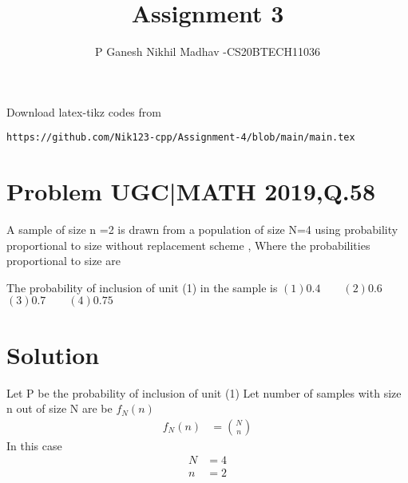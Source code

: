 \documentclass[journal,12pt,twocolumn]{IEEEtran}
\begin{document}
     \def\rightbox#1{\makebox[0in][r]{#1}}
     \def\centbox#1{\makebox[0in]{#1}}
     \def\topbox#1{\raisebox{-\baselineskip}[0in][0in]{#1}}
     \def\midbox#1{\raisebox{-0.5\baselineskip}[0in][0in]{#1}}
\vspace{3cm}
\title{Assignment 3}
\author{P Ganesh Nikhil Madhav -CS20BTECH11036}
\maketitle
\newpage
\bigskip
\renewcommand{\thefigure}{\theenumi}
\renewcommand{\thetable}{\theenumi}
Download latex-tikz codes from 
%
\begin{lstlisting}
https://github.com/Nik123-cpp/Assignment-4/blob/main/main.tex
\end{lstlisting}
\section{ Problem UGC|MATH 2019,Q.58}
A sample of size n =2 is drawn from a population of size N=4 using probability proportional to size without replacement scheme , Where the probabilities proportional to size are

\begin{table}[h!]
\end{table}  

The probability of inclusion of unit (1) in the sample is 
\newline
$(1) 0.4 \quad \quad  (2) 0.6$
\newline
$(3) 0.7 \quad  \quad (4) 0.75$
\section{Solution }
Let P be the probability of inclusion of unit (1)
\newline
Let number of  samples with size n out of size N are be $f_{N}(n)$ 
\begin{align}
    f_{N}(n)&=\binom{N}{n}
\end{align}
In this case
\begin{align}
    N&=4
    \\
    n&=2
\end{align}
\end{document}
